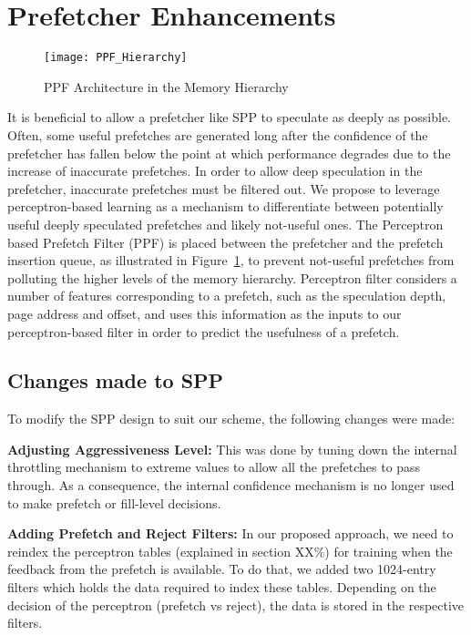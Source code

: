 \section{Prefetcher Enhancements}
\label{Enhancements}

\begin{figure}
  \begin{center}
  \texttt{[image: PPF\_Hierarchy]}
  \caption{PPF Architecture in the Memory Hierarchy}
  \label{fig:PPF_Hierarchy}
  \end{center}
\end{figure}

It is beneficial to allow a prefetcher like SPP to speculate as 
deeply as possible. Often, some useful prefetches are generated long 
after the confidence of the prefetcher has fallen below the point at 
which performance degrades due to the increase of inaccurate prefetches.  
In order to allow deep speculation in the prefetcher, inaccurate
prefetches must be filtered out. We propose to leverage
perceptron-based learning as a mechanism to differentiate between
potentially useful deeply speculated prefetches and likely not-useful
ones. The Perceptron based Prefetch Filter (PPF) is placed between the
prefetcher and the prefetch insertion queue, as illustrated in
Figure~\ref{fig:PPF_Hierarchy}, to prevent not-useful prefetches from
polluting the higher levels of the memory hierarchy.
Perceptron filter considers a number of features corresponding to a
prefetch, such as the speculation depth, page address and offset, and uses
this information as the inputs to our perceptron-based filter in order
to predict the usefulness of a prefetch.  

\subsection{Changes made to SPP}
\label{Enhancements-SPP}
To modify the SPP design to suit our scheme, the following changes
were made:

\noindent \textbf{Adjusting Aggressiveness Level:}
This was done by tuning down the internal throttling mechanism to 
extreme values to allow all the prefetches to pass through. As a 
consequence, the internal confidence mechanism is no longer used
to make prefetch or fill-level decisions.

\noindent \textbf{Adding Prefetch and Reject Filters:}
In our proposed approach, we need to reindex the perceptron tables (explained in
section XX\%) for training when the feedback from the prefetch is available.
To do that, we added two 1024-entry filters which holds the data required to index
these tables. Depending on the decision of the perceptron (prefetch vs reject), the
data is stored in the respective filters.

